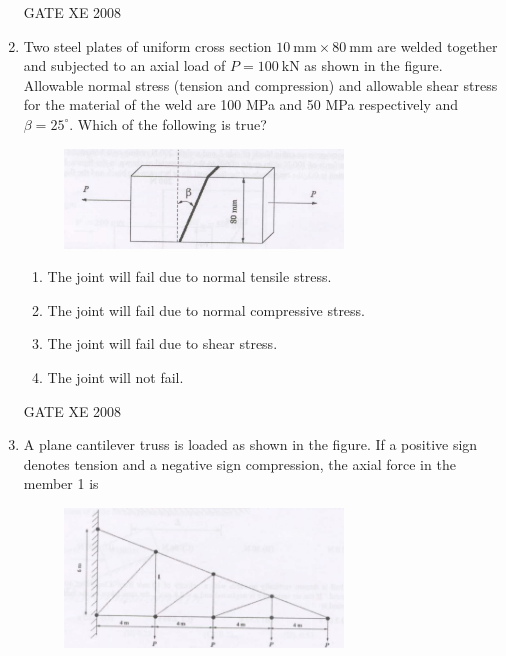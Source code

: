 \documentclass[12pt]{article}
\begin{document}
\begin{enumerate}[label=Q\arabic*.]
\begin{enumerate}[label=(\Alph*)]
\end{enumerate}
    
    GATE XE 2008
    
    \item Two steel plates of uniform cross section $10 \ \mathrm{mm} \times 80 \ \mathrm{mm}$ are welded together and subjected to an axial load of $P=100 \ \mathrm{kN}$ as shown in the figure. Allowable normal stress (tension and compression) and allowable shear stress for the material of the weld are 100 MPa and 50 MPa respectively and $\beta = 25^\circ$. Which of the following is true?

    \begin{figure}[H]
\centering
  \includegraphics[width=0.7\textwidth]{figs/ass1_f_q15.png}
  \caption{}
\end{figure}

\begin{enumerate}[label=(\Alph*)]
\item  The joint will fail due to normal tensile stress.
\item  The joint will fail due to normal compressive stress.
\item  The joint will fail due to shear stress.
\item  The joint will not fail.
\end{enumerate}
    
    GATE XE 2008
    
    \item A plane cantilever truss is loaded as shown in the figure. If a positive sign denotes tension and a negative sign compression, the axial force in the member 1 is

     \begin{figure}[H]
    \centering
    \includegraphics[width=0.7\textwidth]{figs/ass1_f_q16.png}
    \caption{}
\end{figure}


\end{enumerate}
\end{document}
